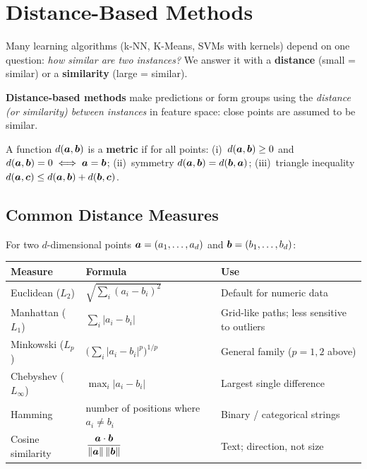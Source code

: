 \section{Distance-Based Methods}

Many learning algorithms (k-NN, K-Means, SVMs with kernels) depend on one question: \emph{how similar are two instances?} We answer it with a \textbf{distance} (small = similar) or a \textbf{similarity} (large = similar).

\begin{definition}
\textbf{Distance-based methods} make predictions or form groups using the \emph{distance (or similarity) between instances} in feature space: close points are assumed to be similar.
\end{definition}

\begin{definition}
A function $d(\boldsymbol{a},\boldsymbol{b})$ is a \textbf{metric} if for all points: (i)~$d(\boldsymbol{a},\boldsymbol{b})\ge0$ and $d(\boldsymbol{a},\boldsymbol{b})=0\iff\boldsymbol{a}=\boldsymbol{b}$; (ii)~symmetry $d(\boldsymbol{a},\boldsymbol{b})=d(\boldsymbol{b},\boldsymbol{a})$; (iii)~triangle inequality $d(\boldsymbol{a},\boldsymbol{c})\le d(\boldsymbol{a},\boldsymbol{b})+d(\boldsymbol{b},\boldsymbol{c})$.
\end{definition}

\subsection{Common Distance Measures}

For two $d$-dimensional points $\boldsymbol{a}=(a_1,\dots,a_d)$ and $\boldsymbol{b}=(b_1,\dots,b_d)$:

\begin{center}
\begin{tabular}{@{}p{3.3cm}p{5.8cm}p{4.4cm}@{}}
\toprule
\textbf{Measure} & \textbf{Formula} & \textbf{Use}\\
\midrule
Euclidean ($L_2$) & $\sqrt{\sum_i (a_i-b_i)^2}$ & Default for numeric data\\
Manhattan ($L_1$) & $\sum_i |a_i-b_i|$ & Grid-like paths; less sensitive to outliers\\
Minkowski ($L_p$) & $\big(\sum_i |a_i-b_i|^p\big)^{1/p}$ & General family ($p=1,2$ above)\\
Chebyshev ($L_\infty$) & $\max_i |a_i-b_i|$ & Largest single difference\\
Hamming & number of positions where $a_i\neq b_i$ & Binary / categorical strings\\
Cosine similarity & $\dfrac{\boldsymbol{a}\cdot\boldsymbol{b}}{\|\boldsymbol{a}\|\,\|\boldsymbol{b}\|}$ & Text; direction, not size\\
\bottomrule
\end{tabular}
\end{center}

